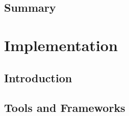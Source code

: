 \documentclass[12pt,a4paper]{report}
\begin{document}
\section{Summary}

\chapter{Implementation}

\section{Introduction}

\section{Tools and Frameworks}
\end{document}
